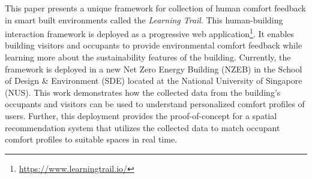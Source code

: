 

This paper presents a unique framework for collection of human comfort feedback in smart built environments called the \emph{Learning Trail}. This human-building interaction framework is deployed as a progressive web application\footnote{\url{https://www.learningtrail.io/}}. It enables building visitors and occupants to provide environmental comfort feedback while learning more about the sustainability features of the building. Currently, the framework is deployed in a new Net Zero Energy Building (NZEB) in the School of Design \& Environment (SDE) located at the National University of Singapore (NUS). This work demonstrates how the collected data from the building's occupants and visitors can be used to understand personalized comfort profiles of users. Further, this deployment provides the proof-of-concept for a spatial recommendation system that utilizes the collected data to match occupant comfort profiles to suitable spaces in real time.




